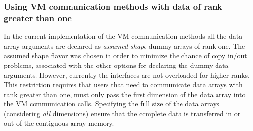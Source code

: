  
\setlength{\oldparskip}{\parskip}
\setlength{\parskip}{1.5ex}
\setlength{\oldparindent}{\parindent}
\setlength{\parindent}{0pt}
\setlength{\oldbaselineskip}{\baselineskip}
\setlength{\baselineskip}{11pt}
 
\def\bv{\begin{verbatim}}
\def\ev{\end{verbatim}}
\def\be{\begin{equation}}
\def\ee{\end{equation}}
\def\bea{\begin{eqnarray}}
\def\eea{\end{eqnarray}}
\def\bi{\begin{itemize}}
\def\ei{\end{itemize}}
\def\bn{\begin{enumerate}}
\def\en{\end{enumerate}}
\def\bd{\begin{description}}
\def\ed{\end{description}}
\def\({\left (}
\def\){\right )}
\def\[{\left [}
\def\]{\right ]}
\def\<{\left  \langle}
\def\>{\right \rangle}
\def\cI{{\cal I}}
\def\diag{\mathop{\rm diag}}
\def\tr{\mathop{\rm tr}}


 

  
   \subsubsection{Using VM communication methods with data of rank greater than one}
   \label{vm_higherrank}
  
   In the current implementation of the VM communication methods all the data
   array arguments are declared as {\em assumed shape} dummy arrays of rank one.
   The assumed shape flavor was chosen in order to minimize the chance of 
   copy in/out problems, associated with the other options for declaring the 
   dummy data arguments.
   However, currently the interfaces are not overloaded for higher ranks. This
   restriction requires that users that need to communicate data arrays with
   rank greater than one, must only pass the first dimension of the data array
   into the VM communication calls. Specifying the full size of the data arrays
   (considering {\em all} dimensions) ensure that the complete data is
   transferred in or out of the contiguous array memory. 

